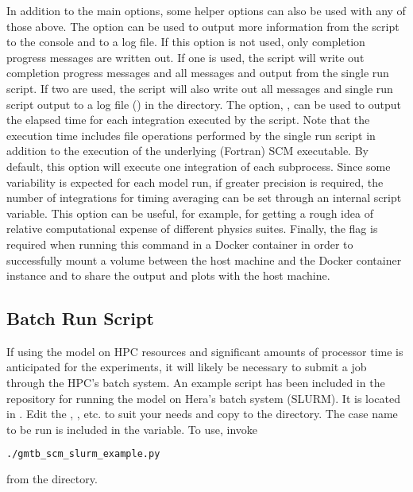 In addition to the main options, some helper options can also be used with any of those above. The  option can be used to output more information from the script to the console and to a log file. If this option is not used, only completion progress messages are written out. If one  is used, the script will write out completion progress messages and all messages and output from the single run script. If two  are used, the script will also write out all messages and single run script output to a log file () in the  directory. The option, , can be used to output the elapsed time for each integration executed by the script. Note that the execution time includes file operations performed by the single run script in addition to the execution of the underlying (Fortran) SCM executable. By default, this option will execute one integration of each subprocess. Since some variability is expected for each model run, if greater precision is required, the number of integrations for timing averaging can be set through an internal script variable. This option can be useful, for example, for getting a rough idea of relative computational expense of different physics suites. Finally, the  flag is required when running this command in a Docker container in order to successfully mount a volume between the host machine and the Docker container instance and to share the output and plots with the host machine.

\subsection{Batch Run Script}

If using the model on HPC resources and significant amounts of processor time is anticipated for the experiments, it will likely be necessary to submit a job through the HPC's batch system. An example script has been included in the repository for running the model on Hera's batch system (SLURM). It is located in . Edit the , , etc. to suit your needs and copy to the  directory. The case name to be run is included in the  variable. To use, invoke
\begin{lstlisting}[language=bash]
./gmtb_scm_slurm_example.py
\end{lstlisting}
from the  directory.


